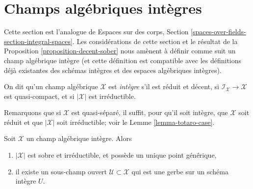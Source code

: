 %
\section{Champs alg\'ebriques int\`egres}
\label{section-integral-stacks}

\noindent
Cette section est l'analogue de Espaces sur des corps, Section
\ref{spaces-over-fields-section-integral-spaces}.
Les consid\'erations de cette section et le r\'esultat de la
Proposition \ref{proposition-decent-sober} nous am\`enent \`a d\'efinir
comme suit un champ alg\'ebrique int\`egre (et cette d\'efinition est compatible
avec les d\'efinitions d\'ej\`a existantes des sch\'emas int\`egres et
des espaces alg\'ebriques int\`egres).

\begin{definition}
\label{definition-integral-algebraic-stack}
On dit qu'un champ alg\'ebrique $\mathcal{X}$ est
{\it int\`egre} s'il est r\'eduit et d\'ecent, si
$\mathcal{I}_\mathcal{X} \to \mathcal{X}$ est quasi-compact,
et si $|\mathcal{X}|$ est irr\'eductible.
\end{definition}

\noindent
Remarquons que si $\mathcal{X}$ est quasi-s\'epar\'e, il suffit,
pour qu'il soit int\`egre, que $\mathcal{X}$ soit r\'eduit et que
$|\mathcal{X}|$ soit irr\'eductible; voir le Lemme \ref{lemma-totaro-case}.

\begin{lemma}
\label{lemma-structure-integral-stack}
Soit $\mathcal{X}$ un champ alg\'ebrique int\`egre. Alors
\begin{enumerate}
\item $|\mathcal{X}|$ est sobre et irr\'eductible, et poss\`ede un unique point g\'en\'erique,
\item il existe un sous-champ ouvert $\mathcal{U} \subset \mathcal{X}$
qui est une gerbe sur un sch\'ema int\`egre $U$.
\end{enumerate}
\end{lemma}

